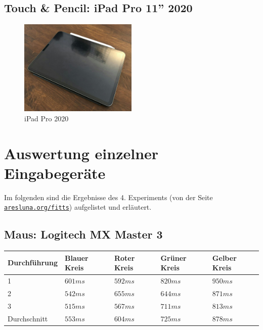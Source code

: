 \documentclass{article}
\begin{document}
\subsection{Touch \& Pencil: iPad Pro 11'' 2020}

\begin{figure}[h!]
	\centering
	\includegraphics[width=0.5\textwidth]{ipad}
	\caption{iPad Pro 2020}
\end{figure}

\section{Auswertung einzelner Eingabegeräte}

Im folgenden sind die Ergebnisse des 4. Experiments (von der Seite
\href{https://www.aresluna.org/fitts}{\texttt{aresluna.org/fitts}}) aufgelistet
und erläutert.

\subsection{Maus: Logitech MX Master 3}

\vspace{0.5em}

\begin{tabularx}{\textwidth}{|X|X|X|X|X|}
	\hline
	Durchführung & Blauer Kreis & Roter Kreis & Grüner Kreis & Gelber Kreis \\
	\hline
	1            & $601ms$      & $592ms$     & $820ms$      & $950ms$      \\
	\hline
	2            & $542ms$      & $655ms$     & $644ms$      & $871ms$      \\
	\hline
	3            & $515ms$      & $567ms$     & $711ms$      & $813ms$      \\
	\hline
	\hline
	Durchschnitt & $553ms$      & $604ms$     & $725ms$      & $878ms$      \\
	\hline
\end{tabularx}
\vspace{0.5em}
\end{document}
